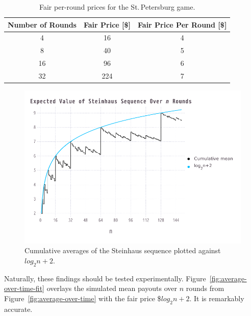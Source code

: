 \documentclass[11pt]{article}
\begin{document}
\begin{table}
  \centering
  \begin{tabular}{ccc}
    \toprule
    \textbf{Number of Rounds} & \textbf{Fair Price [\$]} & \textbf{Fair Price Per Round [\$]} \\
    \midrule
    4  & 16  & 4 \\
    8  & 40  & 5 \\
    16 & 96  & 6 \\
    32 & 224 & 7 \\
    \bottomrule
  \end{tabular}
  \caption{Fair per-round prices for the St.\,Petersburg game.}
  \label{tab:fair}
\end{table}

\begin{figure}
  \centering
  \includegraphics[width=\textwidth]{steinhaus}
  \caption{Cumulative averages of the Steinhaus sequence plotted against $log_2n+2$.}
  \label{fig:steinhaus}
\end{figure}

Naturally, these findings should be tested experimentally. Figure~\ref{fig:average-over-time-fit} overlays the simulated mean payouts over $n$ rounds from Figure~\ref{fig:average-over-time} with the fair price \$$log_2n+2$. It is remarkably accurate.
\end{document}
